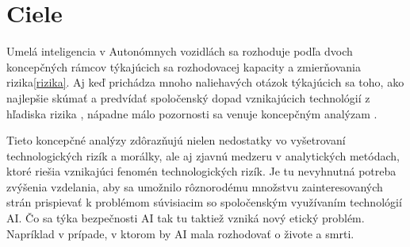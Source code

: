 \documentclass[10pt,oneside,slovak,a4paper]{article}
\begin{document}
\begin{center}
\end{center}


\section{Ciele}
Umelá inteligencia v Autonómnych vozidlách sa rozhoduje podľa dvoch koncepčných rámcov týkajúcich sa rozhodovacej kapacity a zmierňovania rizika\ref{rizika}. Aj keď prichádza mnoho naliehavých otázok týkajúcich sa toho, ako najlepšie skúmať a predvídať spoločenský dopad vznikajúcich technológií z hľadiska rizika \cite{asveld2009ethics}, nápadne málo pozornosti sa venuje koncepčným analýzam \cite{asveld2009ethics}. \par Tieto koncepčné analýzy zdôrazňujú nielen nedostatky vo vyšetrovaní technologických rizík a morálky, ale aj zjavnú medzeru v analytických metódach, ktoré riešia vznikajúci fenomén technologických rizík. Je tu nevyhnutná potreba zvýšenia vzdelania, aby sa umožnilo rôznorodému množstvu zainteresovaných strán prispievať k problémom súvisiacim so spoločenským využívaním technológií AI. Čo sa týka bezpečnosti AI tak tu taktiež vzniká nový etický problém. Napríklad v prípade, v ktorom by AI mala rozhodovať o živote a smrti.
~\cite{doi:10.1080/08839514.2019.1600301,7368032}






























\end{document}
